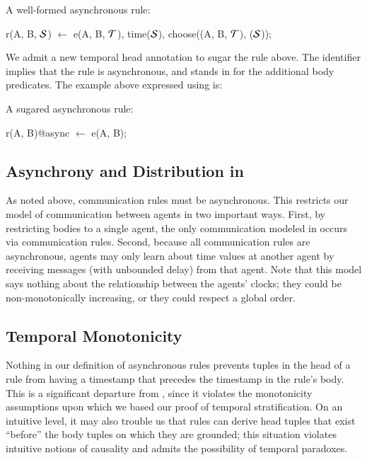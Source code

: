 \begin{example}
A well-formed asynchronous \lang rule:

\begin{Dedalus}
r(A, B, \(\SDedalus\)) \(\leftarrow\) 
  e(A, B, \(\Tau\)),
  time(\(\SDedalus\)),
  choose((A, B, \(\Tau\)), (\(\SDedalus\)));
\end{Dedalus}
\end{example}

We admit a new temporal head annotation to sugar the rule above.  The
identifier  implies that the rule is asynchronous, and stands in for
the additional body predicates.
The example above expressed using  is:

\begin{example}
	A sugared asynchronous \lang rule:
	
\begin{Dedalus}
r(A, B)@async \(\leftarrow\) e(A, B);
\end{Dedalus}
\end{example}

\subsection{Asynchrony and Distribution in {\large{\bf\lang}}}
As noted above, communication rules must be asynchronous.  This restricts our
model of communication between agents in two important ways.  First, by
restricting bodies to a single agent, the only communication modeled in \lang
occurs via communication rules.  Second, because all communication rules are
asynchronous, agents may only learn about time values at another agent by
receiving messages (with unbounded delay) from that agent.  Note that this model
says nothing about the relationship between the agents' clocks; they could be
non-monotonically increasing, or they could respect a global order.

\subsection{Temporal Monotonicity}
Nothing in our definition of asynchronous rules prevents tuples in the
head of a rule from having a timestamp that precedes the timestamp in
the rule's body. This is a significant departure from \slang, since it
violates the monotonicity assumptions upon which we based 
our proof of
temporal stratification.  On an intuitive level, it may also trouble
us that rules can derive head tuples that exist ``before'' the body
tuples on which they are grounded; this situation violates intuitive notions of
causality and admits the possibility of temporal paradoxes.

